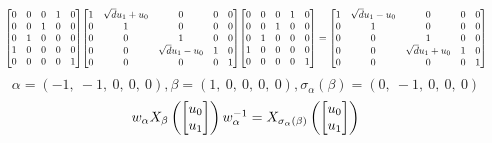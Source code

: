 \documentclass[11pt]{article}
\theoremstyle{definition}
\begin{document}
\[
\scaletoalign{\textwidth}{{\left[\begin{matrix}0 & 0 & 0 & 1 & 0\\0 & 0 & 1 & 0 & 0\\0 & 1 & 0 & 0 & 0\\1 & 0 & 0 & 0 & 0\\0 & 0 & 0 & 0 & 1\end{matrix}\right]} {\left[\begin{matrix}1 & \sqrt{d} u_{1} + u_{0} & 0 & 0 & 0\\0 & 1 & 0 & 0 & 0\\0 & 0 & 1 & 0 & 0\\0 & 0 & \sqrt{d} u_{1} - u_{0} & 1 & 0\\0 & 0 & 0 & 0 & 1\end{matrix}\right]} {\left[\begin{matrix}0 & 0 & 0 & 1 & 0\\0 & 0 & 1 & 0 & 0\\0 & 1 & 0 & 0 & 0\\1 & 0 & 0 & 0 & 0\\0 & 0 & 0 & 0 & 1\end{matrix}\right]} = {\left[\begin{matrix}1 & \sqrt{d} u_{1} - u_{0} & 0 & 0 & 0\\0 & 1 & 0 & 0 & 0\\0 & 0 & 1 & 0 & 0\\0 & 0 & \sqrt{d} u_{1} + u_{0} & 1 & 0\\0 & 0 & 0 & 0 & 1\end{matrix}\right]}}
\]
\[
\alpha = \left( -1, \  -1, \  0, \  0, \  0\right), \beta = \left( 1, \  0, \  0, \  0, \  0\right), \sigma_{\alpha}(\beta) = \left( 0, \  -1, \  0, \  0, \  0\right)
\]
\[
\scaletoalign{\textwidth}{w_{\alpha} X_{\beta}\left(\left[\begin{matrix}u_{0}\\u_{1}\end{matrix}\right]\right) w_{\alpha}^{-1} = X_{\sigma_{\alpha}\left(\beta\right)}\left(\left[\begin{matrix}u_{0}\\u_{1}\end{matrix}\right]\right)}
\]
\end{document}

